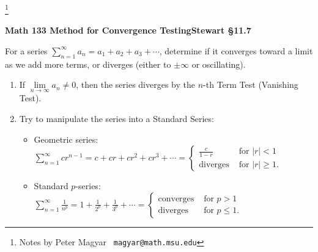 \documentclass[11pt]{article}
\begin{document}
\footnote[0]{Notes by Peter Magyar \ {\tt magyar@math.msu.edu}}
\vspace{-1em}

\centerline{\bf Math 133\hspace{1.5em} \hfill{\Large\bf
Method for Convergence Testing}\hfill Stewart \S11.7}
\vspace{1em}

\noindent 
For a series $\sum_{n=1}^\infty a_n=a_1+a_2+a_3+\cdots$, 
determine if it converges toward a limit 
as we add more terms, or diverges (either to $\pm\infty$ or oscillating).

\begin{enumerate}

\item[0.] If $\lim\limits_{n\to\infty} a_n\neq 0$, then the series diverges
by the $n$-th Term Test (Vanishing Test).

\item Try to manipulate the series into a Standard Series:
\begin{itemize}

\item Geometric series: \ $\sum\limits_{n=1}^\infty cr^{n-1} = c+cr+cr^{2} +c r^3+\cdots
=\left\{\!\!\begin{array}{cl}
\frac{c}{1-r} &\text{ for $|r|<1$}\\
\text{diverges} &\text{ for $|r|\geq 1$.}
\end{array}\right.
$
\item Standard $p$-series: \ 
$\sum\limits_{n=1}^\infty \frac{1}{n^p}
= 1 + \frac{1}{2^p} + \frac{1}{3^p}+\cdots
=\left\{\!\!\begin{array}{cl}
\text{converges}  &\text{ for $p>1$}\\
\text{diverges} &\text{ for $p\leq 1$.}
\end{array}\right.
$

\end{itemize}


\end{enumerate}
\end{document}
